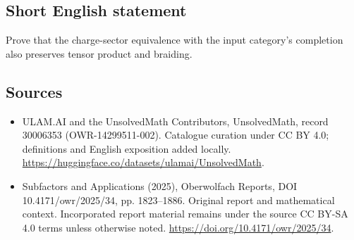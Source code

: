 \documentclass[11pt]{article}
\begin{document}
\subsection{Short English statement}
Prove that the charge-sector equivalence with the input category's completion also preserves tensor product and braiding.
\subsection{Sources}
\begin{itemize}
\item[\hypertarget{source:30006353:1}{S1}] ULAM.AI and the UnsolvedMath Contributors, UnsolvedMath, record 30006353 (OWR-14299511-002). Catalogue curation under CC BY 4.0; definitions and English exposition added locally.
\url{https://huggingface.co/datasets/ulamai/UnsolvedMath}.
\item[\hypertarget{source:30006353:2}{S2}] Subfactors and Applications (2025), Oberwolfach Reports, DOI 10.4171/owr/2025/34, pp. 1823--1886. Original report and mathematical context. Incorporated report material remains under the source CC BY-SA 4.0 terms unless otherwise noted.
\url{https://doi.org/10.4171/owr/2025/34}.
\end{itemize}
\label{end:30006353}
\end{document}
